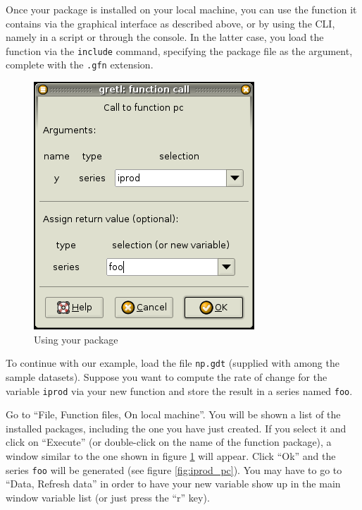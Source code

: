 Once your package is installed on your local machine, you can use the
function it contains via the graphical interface as described above,
or by using the CLI, namely in a script or through the console. In the
latter case, you load the function via the \texttt{include} command,
specifying the package file as the argument, complete with the
\texttt{.gfn} extension.

\begin{figure}[htbp]
  \centering
  \includegraphics[scale=0.5]{figures/function_call}
  \caption{Using your package}
  \label{fig:function_call}
\end{figure}

To continue with our example, load the file \texttt{np.gdt} (supplied
with  among the sample datasets). Suppose you want to
compute the rate of change for the variable \texttt{iprod} via your
new function and store the result in a series named \texttt{foo}.

Go to ``File, Function files, On local machine''.  You will be shown a
list of the installed packages, including the one you have just
created. If you select it and click on ``Execute'' (or double-click on
the name of the function package), a window similar to the one shown
in figure \ref{fig:function_call} will appear.  Click ``Ok'' and the
series \texttt{foo} will be generated (see figure \ref{fig:iprod_pc}).
You may have to go to ``Data, Refresh data'' in order to have your new
variable show up in the main window variable list (or just press the
``r'' key).

